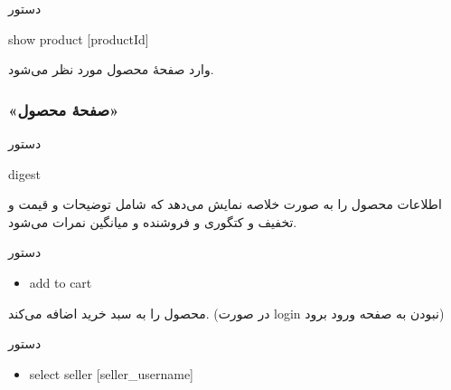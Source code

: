 \documentclass[]{article}
\begin{document}
\begin{mybox}[colback=yellow]{دستور}

\begin{latin}

show product [productId]

\end{latin}

\end{mybox}

وارد صفحهٔ محصول مورد نظر می‌شود.

\subsubsection*{{\titr «صفحهٔ محصول»}}



\begin{mybox}[colback=yellow]{دستور}

\begin{latin}

digest

\end{latin}

\end{mybox}

اطلاعات محصول را به صورت خلاصه نمایش می‌دهد که شامل توضیحات و قیمت و تخفیف و کتگوری و فروشنده و میانگین نمرات می‌شود.


\begin{mybox}[colback=brilliantlavender]{دستور}

\begin{latin}

\begin{itemize}[label = {$\Rightarrow$}]

\item
add to cart

\end{itemize}

\end{latin}

\end{mybox}

محصول را به سبد خرید اضافه می‌کند. (در صورت login نبودن به صفحه ورود برود)


\begin{mybox}[colback=brilliantlavender]{دستور}

\begin{latin}

\begin{itemize}[label = {$\Rightarrow$}]

\item
select seller [seller\_username]

\end{itemize}

\end{latin}

\end{mybox}
\end{document}
